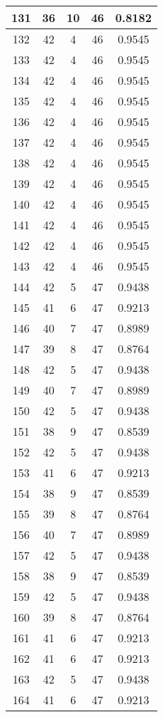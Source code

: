 \documentclass[letterpaper, 12pt]{article}
\begin{document}
\begin{longtable}{|c|c|c|c|c|}
\hline
131 & 36 & 10 & 46 & 0.8182 \\
\hline
132 & 42 & 4 & 46 & 0.9545 \\
\hline
133 & 42 & 4 & 46 & 0.9545 \\
\hline
134 & 42 & 4 & 46 & 0.9545 \\
\hline
135 & 42 & 4 & 46 & 0.9545 \\
\hline
136 & 42 & 4 & 46 & 0.9545 \\
\hline
137 & 42 & 4 & 46 & 0.9545 \\
\hline
138 & 42 & 4 & 46 & 0.9545 \\
\hline
139 & 42 & 4 & 46 & 0.9545 \\
\hline
140 & 42 & 4 & 46 & 0.9545 \\
\hline
141 & 42 & 4 & 46 & 0.9545 \\
\hline
142 & 42 & 4 & 46 & 0.9545 \\
\hline
143 & 42 & 4 & 46 & 0.9545 \\
\hline
144 & 42 & 5 & 47 & 0.9438 \\
\hline
145 & 41 & 6 & 47 & 0.9213 \\
\hline
146 & 40 & 7 & 47 & 0.8989 \\
\hline
147 & 39 & 8 & 47 & 0.8764 \\
\hline
148 & 42 & 5 & 47 & 0.9438 \\
\hline
149 & 40 & 7 & 47 & 0.8989 \\
\hline
150 & 42 & 5 & 47 & 0.9438 \\
\hline
151 & 38 & 9 & 47 & 0.8539 \\
\hline
152 & 42 & 5 & 47 & 0.9438 \\
\hline
153 & 41 & 6 & 47 & 0.9213 \\
\hline
154 & 38 & 9 & 47 & 0.8539 \\
\hline
155 & 39 & 8 & 47 & 0.8764 \\
\hline
156 & 40 & 7 & 47 & 0.8989 \\
\hline
157 & 42 & 5 & 47 & 0.9438 \\
\hline
158 & 38 & 9 & 47 & 0.8539 \\
\hline
159 & 42 & 5 & 47 & 0.9438 \\
\hline
160 & 39 & 8 & 47 & 0.8764 \\
\hline
161 & 41 & 6 & 47 & 0.9213 \\
\hline
162 & 41 & 6 & 47 & 0.9213 \\
\hline
163 & 42 & 5 & 47 & 0.9438 \\
\hline
164 & 41 & 6 & 47 & 0.9213 \\

\end{longtable}
\end{document}
